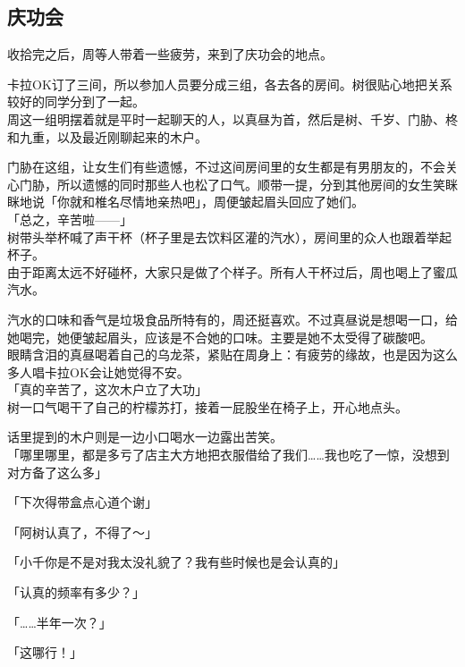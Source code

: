 \subsection{庆功会}

收拾完之后，周等人带着一些疲劳，来到了庆功会的地点。

卡拉OK订了三间，所以参加人员要分成三组，各去各的房间。树很贴心地把关系较好的同学分到了一起。\\

周这一组明摆着就是平时一起聊天的人，以真昼为首，然后是树、千岁、门胁、柊和九重，以及最近刚聊起来的木户。

门胁在这组，让女生们有些遗憾，不过这间房间里的女生都是有男朋友的，不会关心门胁，所以遗憾的同时那些人也松了口气。顺带一提，分到其他房间的女生笑眯眯地说「你就和椎名尽情地亲热吧」，周便皱起眉头回应了她们。\\

「总之，辛苦啦——」\\

树带头举杯喊了声干杯（杯子里是去饮料区灌的汽水），房间里的众人也跟着举起杯子。\\

由于距离太远不好碰杯，大家只是做了个样子。所有人干杯过后，周也喝上了蜜瓜汽水。

汽水的口味和香气是垃圾食品所特有的，周还挺喜欢。不过真昼说是想喝一口，给她喝完，她便皱起眉头，应该是不合她的口味。主要是她不太受得了碳酸吧。\\

眼睛含泪的真昼喝着自己的乌龙茶，紧贴在周身上：有疲劳的缘故，也是因为这么多人唱卡拉OK会让她觉得不安。\\

「真的辛苦了，这次木户立了大功」\\

树一口气喝干了自己的柠檬苏打，接着一屁股坐在椅子上，开心地点头。

话里提到的木户则是一边小口喝水一边露出苦笑。\\

「哪里哪里，都是多亏了店主大方地把衣服借给了我们……我也吃了一惊，没想到对方备了这么多」

「下次得带盒点心道个谢」

「阿树认真了，不得了～」

「小千你是不是对我太没礼貌了？我有些时候也是会认真的」

「认真的频率有多少？」

「……半年一次？」

「这哪行！」\\

